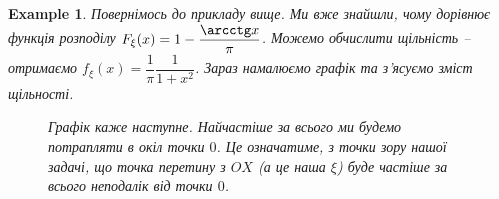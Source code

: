 \documentclass[a4paper, 10pt]{article}
\theoremstyle{theoremdd}
\newtheorem{example}[theorem]{Example}
\begin{document}
\begin{example}
Повернімось до прикладу вище. Ми вже знайшли, чому дорівнює функція розподілу $F_\xi(x) = 1 - \dfrac{\arcctg x}{\pi}$. Можемо обчислити щільність -- отримаємо $f_\xi(x) = \dfrac{1}{\pi} \dfrac{1}{1+x^2}$. Зараз намалюємо графік та з'ясуємо зміст щільності.
\begin{figure}[H]
\centering
{}
\caption*{Графік каже наступне. Найчастіше за всього ми будемо потрапляти в окіл точки $0$. Це означатиме, з точки зору нашої задачі, що точка перетину з $OX$ (а це наша $\xi$) буде частіше за всього неподалік від точки $0$.}
\end{figure}
\end{example}
\end{document}
